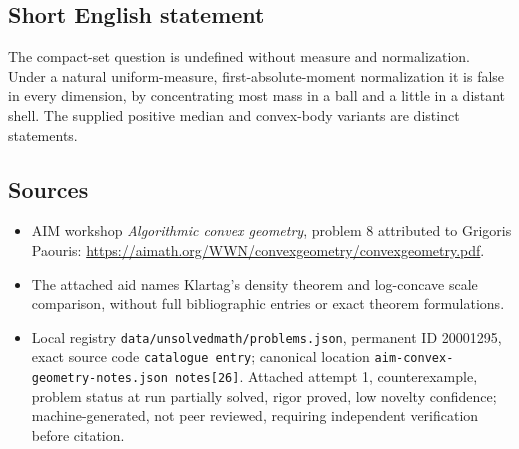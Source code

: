 \documentclass[11pt]{article}
\begin{document}
\subsection{Short English statement}
The compact-set question is undefined without measure and normalization. Under a natural uniform-measure, first-absolute-moment normalization it is false in every dimension, by concentrating most mass in a ball and a little in a distant shell. The supplied positive median and convex-body variants are distinct statements.
\subsection{Sources}
\begin{itemize}
\item AIM workshop \emph{Algorithmic convex geometry}, problem 8 attributed to Grigoris Paouris: \url{https://aimath.org/WWN/convexgeometry/convexgeometry.pdf}.
\item The attached aid names Klartag's density theorem and log-concave scale comparison, without full bibliographic entries or exact theorem formulations.
\item Local registry \texttt{data/unsolvedmath/problems.json}, permanent ID 20001295, exact source code \texttt{catalogue entry}; canonical location \texttt{aim-convex-geometry-notes.json notes[26]}. Attached attempt 1, counterexample, problem status at run partially solved, rigor proved, low novelty confidence; machine-generated, not peer reviewed, requiring independent verification before citation.
\end{itemize}
\end{document}
